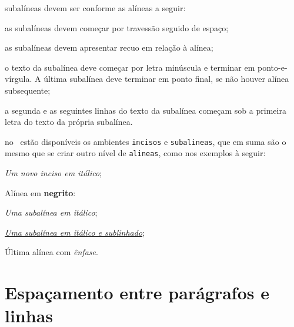\begin{alineas}
  \item subalíneas \cite[4.3]{NBR6024:2012} devem ser conforme as alíneas a
  seguir:

  \begin{alineas}
     \item as subalíneas devem começar por travessão seguido de espaço;

     \item as subalíneas devem apresentar recuo em relação à alínea;

     \item o texto da subalínea deve começar por letra minúscula e terminar em
     ponto-e-vírgula. A última subalínea deve terminar em ponto final, se não
     houver alínea subsequente;

     \item a segunda e as seguintes linhas do texto da subalínea começam sob a
     primeira letra do texto da própria subalínea.
  \end{alineas}
  
  \item no \abnTeX\ estão disponíveis os ambientes \texttt{incisos} e \texttt{subalineas}, que em suma são o mesmo que se criar outro nível de \texttt{alineas}, como nos exemplos à seguir:
  
  \begin{incisos}
    \item \textit{Um novo inciso em itálico};
  \end{incisos}
  
  \item Alínea em \textbf{negrito}:
  
  \begin{subalineas}
    \item \textit{Uma subalínea em itálico};
    \item \underline{\textit{Uma subalínea em itálico e sublinhado}}; 
  \end{subalineas}
  
  \item Última alínea com \emph{ênfase}.
  
\end{alineas}


\section{Espaçamento entre parágrafos e linhas}

